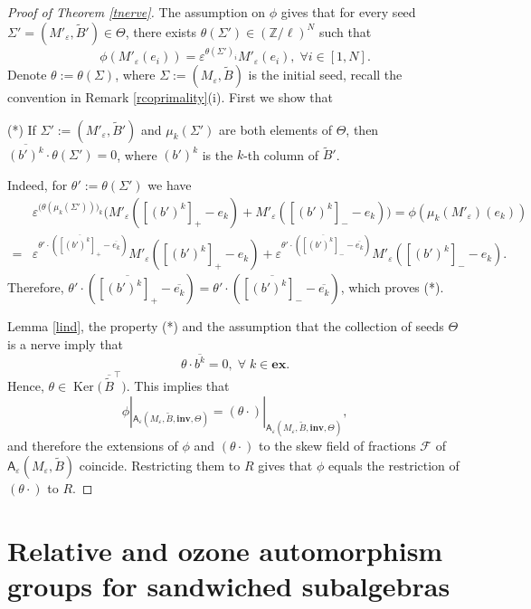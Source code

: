 \documentclass[11pt]{amsart}
\theoremstyle{plain}
\newcommand{\cleqn}{\setcounter{equation}{0}}
\newcommand{\clth}{\setcounter{theorem}{0}}
\newcommand {\sectionnew}[1]{\section{#1}\cleqn\clth}
\newcommand \thref[1]{Theorem \ref{t#1}}
\newcommand \leref[1]{Lemma \ref{l#1}}
\newcommand \reref[1]{Remark \ref{r#1}}
\newcommand \lb[1]{\label{#1}}
\def \Zset {{\mathbb Z}}
\def \A {{\boldsymbol{\mathsf A}}}
\def \B  {{\widetilde{B}}}
\newcommand \ex {{\mathbf{ex}}}
\newcommand \inv {{\mathbf{inv}}}
\def \FF {{\mathcal{F}}}
\def \ep {\varepsilon}
\def \ol {\overline}
\DeclareMathOperator \Ker { {\mathrm{Ker}} }
\begin{document}
\begin{proof}[Proof of \thref{nerve}] The assumption on $\phi$ gives that for every seed $\Sigma' = (M'_\ep, \B') \in \Theta$, there exists $\theta(\Sigma') \in (\Zset / \ell)^N$ such that
\[
\phi( M'_\ep(e_i)) = \ep^{\theta(\Sigma')_i} M'_\ep(e_i), \;\forall i \in [1,N].
\]
Denote $\theta:=\theta(\Sigma)$, where $\Sigma := (M_\ep, \B)$ is the initial seed, recall the convention in \reref{coprimality}(i). First we show that 

(*) If $\Sigma':=(M'_\ep, \B')$ and $\mu_k (\Sigma')$ are both elements of $\Theta$, then $\ol{(b')^k} \cdot \theta(\Sigma')=0$, where $(b')^k$ is the $k$-th column of $\B'$.

Indeed, for $\theta' := \theta(\Sigma')$ we have 
\begin{align*}
&\ep^{\big( \theta(\mu_k(\Sigma')) \big)_k} 
\big( M'_\ep([(b')^k]_+ - e_k) + M'_\ep([(b')^k]_- - e_k) \big)
= \phi (\mu_k (M'_\ep)(e_k)) 
\\
= 
&\ep^{\theta' \cdot (\ol{[(b')^k]_+} - \ol{e_k})}
M'_\ep([(b')^k]_+ - e_k) + 
\ep^{\theta' \cdot (\ol{[(b')^k]_-} - \ol{e_k})}
M'_\ep([(b')^k]_- - e_k).
\end{align*}
Therefore, $\theta' \cdot (\ol{[(b')^k]_+} - \ol{e_k}) = \theta' \cdot (\ol{[(b')^k]_-} - \ol{e_k})$, which proves (*). 

\leref{ind}, the property (*) and the assumption that the collection of seeds $\Theta$ is a nerve imply that 
\[
\theta \cdot \ol{b^k} =0, \; \forall \; k \in \ex.
\]
Hence, $\theta \in \Ker \big( \, \ol{\B}^\top \big)$. This implies that 
\[
\phi|_{\A_\ep(M_\ep, \B, \inv, \Theta)} = 
(\theta \cdot)|_{\A_\ep(M_\ep, \B, \inv, \Theta)},
\]
and therefore the extensions of $\phi$ and $(\theta \cdot)$ to the skew field of fractions $\FF$ of $\A_\ep(M_\ep, \B)$ coincide. Restricting them to $R$ gives that $\phi$ equals the restriction of $(\theta \cdot)$ to $R$. 
\end{proof}
\sectionnew{Relative and ozone automorphism groups for sandwiched subalgebras}
\lb{results}
\end{document}

